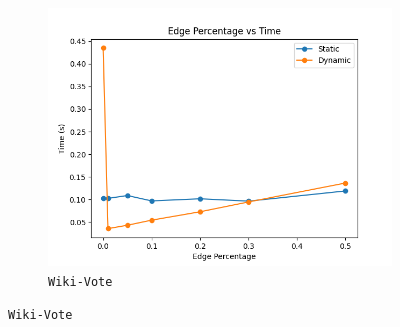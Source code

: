 \begin{figure}[h!]
\begin{subfigure}{0.3\textwidth}
        \includegraphics[width=\linewidth]{./Figures/Wiki-Vote.out.png}
        \caption{\texttt{Wiki-Vote}}
    \end{subfigure}
    \vspace{0.5cm}
    

\end{figure}
